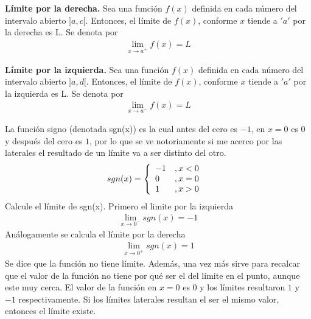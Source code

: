 \begin{mydef}
\textbf{Límite por la derecha. }Sea una función $f(x)$ definida en cada número del intervalo abierto $]a,c[$. Entonces, el límite de $f(x)$, conforme $x$ tiende a $'a'$ por la derecha es L. Se denota por 
\begin{eqnarray*}
\lim_{x\rightarrow a^{+}}f(x)=L
\end{eqnarray*}
\end{mydef}

\begin{mydef}
\textbf{Límite por la izquierda. } Sea una función $f(x)$ definida en cada número del intervalo abierto $]a,d[$. Entonces, el límite de $f(x)$, conforme $x$ tiende a $'a'$ por la izquierda es L. Se denota por 
\begin{eqnarray*}
\lim_{x\rightarrow a^{-}}f(x)=L
\end{eqnarray*}
\end{mydef}

\begin{myexample}
La función signo (denotada sgn(x)) es la cual antes del cero es $-1$, en $x=0$ es $0$ y después del cero es $1$, por lo que se ve notoriamente si me acerco por las laterales el resultado de un límite va a ser distinto del otro. 
\begin{eqnarray*}
sgn(x)= \left\{\begin{array}{ll}
-1&, x< 0\\
0 &, x=0\\ 
1 &, x>0 \\
\end{array} \hspace{6px} \right.
\end{eqnarray*}
Calcule el límite de sgn(x). Primero el limite por la izquierda
\begin{eqnarray*}
\lim_{x\rightarrow 0^{-}}sgn(x)=-1
\end{eqnarray*}
Análogamente se calcula el límite por la derecha
\begin{eqnarray*}
\lim_{x\rightarrow 0^{+}}sgn(x)=1
\end{eqnarray*}
Se dice que la función no tiene límite. Además, una vez más sirve para recalcar que el valor de la función no tiene por qué ser el del límite en el punto, aunque este muy cerca. El valor de la función en $x=0$ es $0$ y los límites resultaron $1$ y $-1$ respectivamente. Si los límites laterales resultan el ser el mismo valor, entonces el límite existe. 
\end{myexample}


